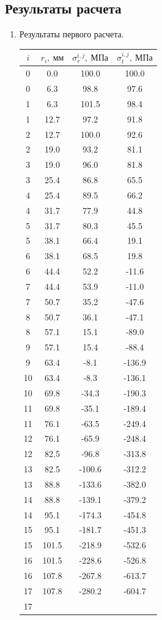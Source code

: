\documentclass[a4paper,10pt]{article}
\begin{document}
\subsection{Результаты расчета}
\begin{enumerate}

\item Результаты первого расчета.

\begin{center}
\begin{tabular}{|c|c|c|c|}
\hline 
$i$ & $r_i,\ мм$ & $\sigma_r^{i,j},\ МПа$ & $\sigma_t^{i,j},\ МПа$ \\ 
\hline 

0 & 0.0 & 100.0 & 100.0 \\ \hline 0 & 6.3 & 98.8 & 97.6 \\ \hline 1 & 6.3 & 101.5 & 98.4 \\ \hline 1 & 12.7 & 97.2 & 91.8 \\ \hline 2 & 12.7 & 100.0 & 92.6 \\ \hline 2 & 19.0 & 93.2 & 81.1 \\ \hline 3 & 19.0 & 96.0 & 81.8 \\ \hline 3 & 25.4 & 86.8 & 65.5 \\ \hline 4 & 25.4 & 89.5 & 66.2 \\ \hline 4 & 31.7 & 77.9 & 44.8 \\ \hline 5 & 31.7 & 80.3 & 45.5 \\ \hline 5 & 38.1 & 66.4 & 19.1 \\ \hline 6 & 38.1 & 68.5 & 19.8 \\ \hline 6 & 44.4 & 52.2 & -11.6 \\ \hline 7 & 44.4 & 53.9 & -11.0 \\ \hline 7 & 50.7 & 35.2 & -47.6 \\ \hline 8 & 50.7 & 36.1 & -47.1 \\ \hline 8 & 57.1 & 15.1 & -89.0 \\ \hline 9 & 57.1 & 15.4 & -88.4 \\ \hline 9 & 63.4 & -8.1 & -136.9 \\ \hline 10 & 63.4 & -8.3 & -136.1 \\ \hline 10 & 69.8 & -34.3 & -190.3 \\ \hline 11 & 69.8 & -35.1 & -189.4 \\ \hline 11 & 76.1 & -63.5 & -249.4 \\ \hline 12 & 76.1 & -65.9 & -248.4 \\ \hline 12 & 82.5 & -96.8 & -313.8 \\ \hline 13 & 82.5 & -100.6 & -312.2 \\ \hline 13 & 88.8 & -133.6 & -382.0 \\ \hline 14 & 88.8 & -139.1 & -379.2 \\ \hline 14 & 95.1 & -174.3 & -454.8 \\ \hline 15 & 95.1 & -181.7 & -451.3 \\ \hline 15 & 101.5 & -218.9 & -532.6 \\ \hline 16 & 101.5 & -228.6 & -526.8 \\ \hline 16 & 107.8 & -267.8 & -613.7 \\ \hline 17 & 107.8 & -280.2 & -604.7 \\ \hline 17 
\end{tabular}
\end{center}
\end{enumerate}
\end{document}
